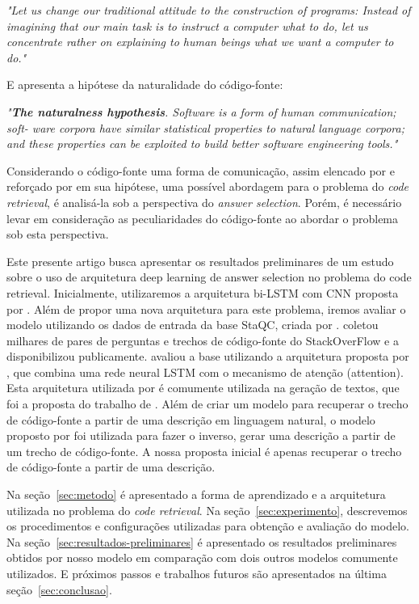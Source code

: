 \documentclass[12pt]{article}
\begin{document}
\textit{"Let us change our traditional attitude to the construction of programs: Instead of imagining that our
main task is to instruct a computer what to do, let us
concentrate rather on explaining to human beings what
we want a computer to do."}

E \cite{Allamanis:2018:SML} apresenta a hipótese da naturalidade do código-fonte:

\textit{"\textbf{The naturalness hypothesis}. Software is a form of human communication; soft-
ware corpora have similar statistical properties to natural language corpora; and these
properties can be exploited to build better software engineering tools."}

Considerando o código-fonte uma forma de comunicação, assim elencado por \cite{Knuth:1984:LP} e reforçado por \cite{Allamanis:2018:SML} em sua hipótese, uma possível abordagem para o problema 
do \textit{code retrieval}, é analisá-la sob a perspectiva do \textit{answer selection}. Porém, é necessário levar em consideração as peculiaridades do código-fonte ao abordar o problema sob esta perspectiva. 

Este presente artigo busca apresentar os resultados preliminares de um estudo sobre o uso de arquitetura deep learning de answer selection no problema do code retrieval.
Inicialmente, utilizaremos a arquitetura bi-LSTM com CNN proposta por \cite{tan-lstm-qa}. Além de propor uma nova arquitetura para este problema, iremos avaliar o modelo 
utilizando os dados de entrada da base StaQC, criada por \cite{Yao-staqc:2018}. \cite{Yao-staqc:2018} coletou milhares de pares de perguntas e trechos de código-fonte do StackOverFlow e a 
disponibilizou publicamente. \cite{Yao-staqc:2018} avaliou a base utilizando a arquitetura proposta por \cite{iyer-etal-2016-summarizing}, que combina uma rede neural LSTM com o mecanismo 
de atenção (attention). Esta arquitetura utilizada por \cite{iyer-etal-2016-summarizing} é comumente utilizada na geração de textos, que foi a proposta do trabalho de \cite{iyer-etal-2016-summarizing}. Além de criar um modelo
para recuperar o trecho de código-fonte a partir de uma descrição em linguagem natural, o modelo proposto por \cite{iyer-etal-2016-summarizing} foi utilizada para fazer o inverso, gerar uma descrição
a partir de um trecho de código-fonte. A nossa proposta inicial é apenas recuperar o trecho de código-fonte a partir de uma descrição.

Na seção~\ref{sec:metodo} é apresentado a forma de aprendizado e a arquitetura utilizada no problema do \textit{code retrieval}. Na seção~\ref{sec:experimento}, descrevemos os procedimentos e configurações utilizadas para obtenção e avaliação do modelo. Na seção~\ref{sec:resultados-preliminares} é apresentado os resultados preliminares obtidos por nosso modelo em comparação com dois outros modelos comumente utilizados. E próximos passos e trabalhos futuros são apresentados na última seção~\ref{sec:conclusao}.
\end{document}
